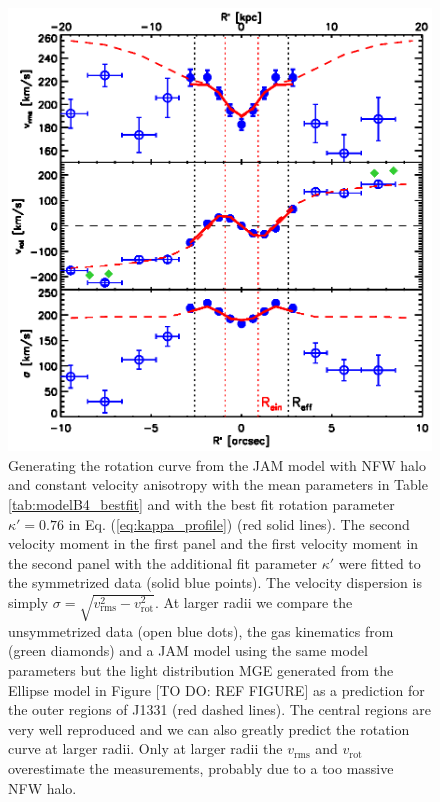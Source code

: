 \begin{figure}
\centering
\includegraphics[width=0.7\linewidth]{fig/B4_rms_rot_curves_best_model.ps}
\caption{Generating the rotation curve from the JAM model with NFW halo and constant velocity anisotropy with the mean parameters in Table \ref{tab:modelB4_bestfit} and with the best fit rotation parameter $\kappa' = 0.76$ in Eq. (\ref{eq:kappa_profile}) (red solid lines). The second velocity moment in the first panel and the first velocity moment in the second panel with the additional fit parameter $\kappa'$ were fitted to the symmetrized data (solid blue points). The velocity dispersion is simply $\sigma = \sqrt{v_\text{rms}^2 - v_\text{rot}^2}$. At larger radii we compare the unsymmetrized data (open blue dots), the gas kinematics from \citet{SWELLSV} (green diamonds) and a JAM model using the same model parameters but the light distribution MGE generated from the Ellipse model in Figure [TO DO: REF FIGURE] as a prediction for the outer regions of J1331 (red dashed lines). The central regions are very well reproduced and we can also greatly predict the rotation curve at larger radii. Only at larger radii the $v_\text{rms}$ and $v_\text{rot}$ overestimate the measurements, probably due to a too massive NFW halo.}
\label{fig:modelB4_vrot}
\end{figure}
